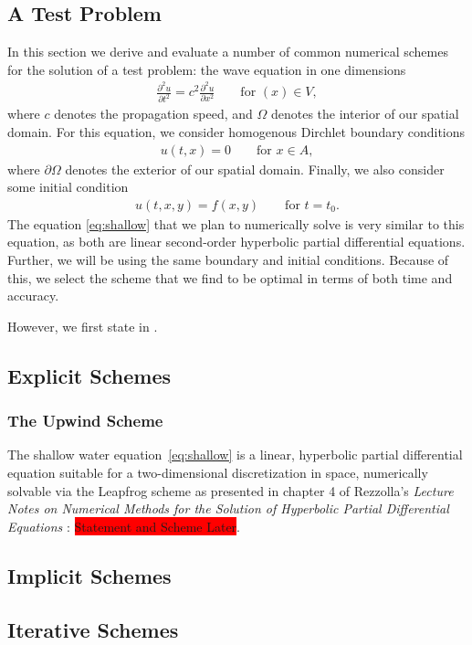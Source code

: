 \documentclass[../main.tex]{subfiles}
\begin{document}
\subsection{A Test Problem}
In this section we derive and evaluate a number of common numerical schemes for the solution of a test problem: the wave equation in one dimensions
\begin{gather}\label{eq:wave}
    \frac{\partial^2 u}{\partial t^2} = c^2\frac{\partial^2 u}{\partial x^2}\qquad\text{for }(x)\in V,
\end{gather}
where $c$ denotes the propagation speed, and $\Omega$ denotes the interior of our spatial domain. For this equation, we consider homogenous Dirchlet boundary conditions
\begin{gather}\label{eq:bcs}
    u(t,x) = 0\qquad\text{for }x\in A,
\end{gather}
where $\partial\Omega$ denotes the exterior of our spatial domain. Finally, we also consider some initial condition
\begin{gather}\label{eq:ic}
    u(t,x,y) = f(x,y)\qquad\text{for }t=t_0.
\end{gather}
The equation \ref{eq:shallow}  that we plan to numerically solve is very similar to this equation, as both are linear second-order hyperbolic partial differential equations. Further, we will be using the same boundary and initial conditions. Because of this, we select the scheme that we find to be optimal in terms of both time and accuracy.

\noindent However, we first state \label{eq:wave} in .

\subsection{Explicit Schemes}
\subsubsection{The Upwind Scheme}


The shallow water equation~\ref{eq:shallow} is a linear, hyperbolic partial differential equation suitable for a two-dimensional discretization in space, numerically solvable via the Leapfrog scheme as presented in chapter 4 of Rezzolla's \textit{Lecture Notes on Numerical Methods for the Solution of Hyperbolic Partial Differential Equations} \cite{rezzolla}: \colorbox{red}{Statement and Scheme Later}.
\subsection{Implicit Schemes}

\subsection{Iterative Schemes}
\end{document}
